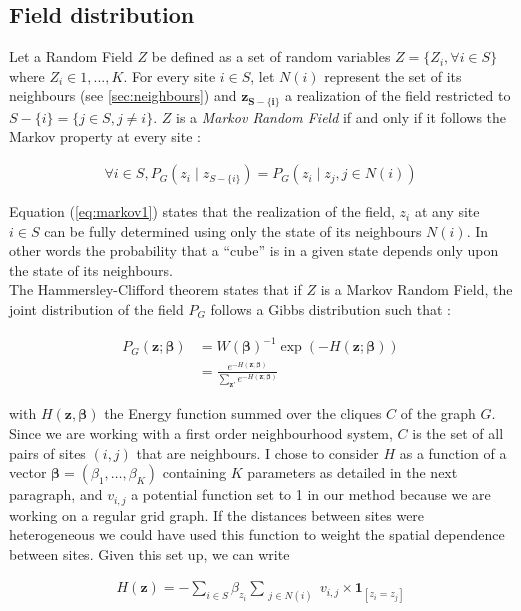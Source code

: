 	\subsection{Field distribution}
Let a Random Field $Z$ be defined as a set of random variables $Z = \{Z_i , \forall i \in S\}$ where $Z_i \in {1,...,K}$. For every site $i \in S$, let $N(i)$ represent the set of its neighbours (see \ref{sec:neighbours}) and $\boldsymbol{z_{S-\{i\}}}$ a realization of the field restricted to $S-\{i\} = \{j \in S, j \neq i\}$. $Z$ is a \emph{Markov Random Field} if and only if it follows the Markov property at every site :

\begin{align}
\label{eq:markov1}
\forall i \in S, P_G (z_i \mid z_{S-\{i\}}) = P_G (z_i \mid z_j , j \in N(i))
\end{align}

Equation (\ref{eq:markov1}) states that the realization of the field, $z_{i}$ at any site $i \in S$ can be fully determined using only the state of its neighbours $N(i)$. In other words the probability that a ``cube'' is in a given state depends only upon the state of its neighbours.\\

The Hammersley-Clifford theorem states that if $Z$ is a Markov Random Field, the joint distribution of the field $P_G$ follows a Gibbs distribution such that :

\begin{align}
\label{eq:prior}
P_G (\boldsymbol{z;\beta}) &= W(\boldsymbol{\beta})^{-1} \exp{(-H(\boldsymbol{z;\beta}))} \nonumber\\
&= \frac{e^{-H(\boldsymbol{z;\beta})}}{\sum\limits_{\boldsymbol{z'}} e^{-H(\boldsymbol{z;\beta})}}
\end{align}

with $H(\boldsymbol{z},\boldsymbol{\beta})$ the Energy function summed over the cliques $C$ of the graph $G$. Since we are working with a first order neighbourhood system, $C$ is the set of all pairs of sites $(i,j)$ that are neighbours. I chose to consider $H$ as a function of a vector $\boldsymbol{\beta} = (\beta_1, \hdots, \beta_K)$ containing $K$ parameters as detailed in the next paragraph, and $v_{i,j}$ a potential function set to 1 in our method because we are working on a regular grid graph. If the distances between sites were heterogeneous we could have used this function to weight the spatial dependence between sites. Given this set up, we can write

\begin{align}
\label{eq:Energy}
H(\boldsymbol{z}) = - \sum\limits_{i \in S}\beta_{z_i}\sum_{\substack{j \in N(i)}}v_{i,j}\times\boldsymbol{1}_{[z_i = z_j]} 
\end{align}

